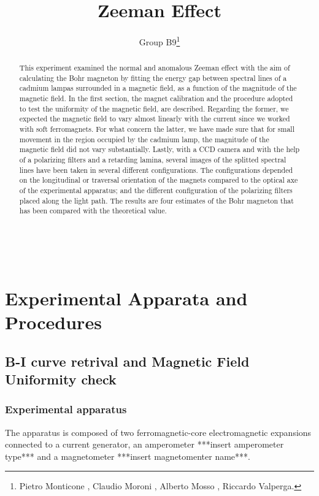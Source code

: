 \documentclass[a4paper,12pt,abstracton]{scrartcl}
\title{Zeeman Effect}
\author{Group B9\footnote{Pietro Monticone , Claudio Moroni , Alberto Mosso , Riccardo Valperga.}}
\begin{document}
\maketitle
\makenomenclature
\begin{abstract}
This experiment examined the normal and anomalous Zeeman effect with the aim of calculating the Bohr magneton by fitting the energy gap between spectral lines of a cadmium lampas surrounded in a magnetic field, as a function of the magnitude of the magnetic field. In the first section, the magnet calibration and the procedure adopted to test the uniformity of the magnetic field, are described. Regarding the former, we expected the magnetic field to vary almost linearly with the current since we worked with soft ferromagnets. For what concern the latter, we have made sure that for small movement in the region occupied by the cadmium lamp, the magnitude of the magnetic field did not vary substantially. Lastly, with a CCD camera and with the help of a polarizing filters and a retarding lamina, several images of the splitted spectral lines have been taken in several different configurations. The configurations depended on the longitudinal or traversal orientation of the magnets compared to the optical axe of the experimental apparatus; and the different configuration of the polarizing filters placed along the light path. The results are four estimates of the Bohr magneton that has been compared with the theoretical value.
\end{abstract}
\clearpage
\tableofcontents

\mbox{
}
\newpage
\section{Experimental Apparata and Procedures}
\subsection{B-I curve retrival and Magnetic Field Uniformity check}
\subsubsection{Experimental apparatus}
The apparatus is composed of two ferromagnetic-core electromagnetic expansions connected to a current generator, an amperometer ***insert amperometer type*** and a magnetometer ***insert magnetomenter name***.
\end{document}
